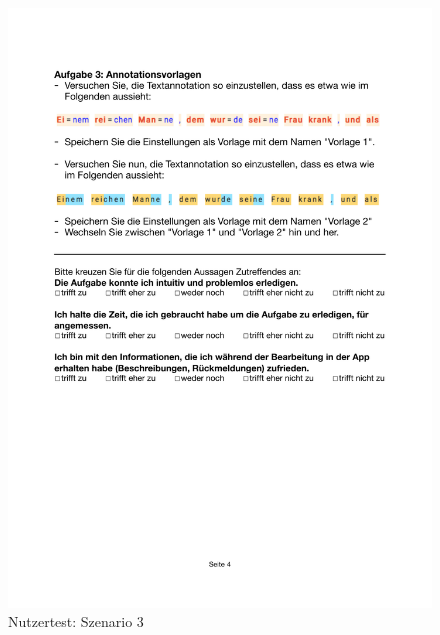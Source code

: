 \begin{figure}[h]
	\centering
	\includegraphics[width=.95\linewidth, frame]{figures/evaluation/test3}
	\caption{Nutzertest: Szenario 3}
	\label{fig:evaluation-test3}
\end{figure}
\newpage

